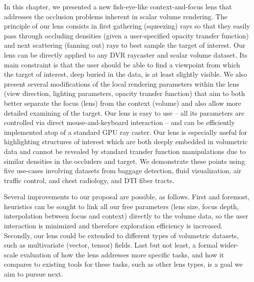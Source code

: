 In this chapter, we presented a new fish-eye-like context-and-focus lens that addresses the occlusion problems inherent in scalar volume rendering. The principle of our lens consists in first gathering (squeezing) rays so that they easily pass through occluding densities (given a user-specified opacity transfer function) and next scattering (fanning out) rays to best sample the target of interest. Our lens can be directly applied to any DVR raycaster and scalar volume dataset. Its main constraint is that the user should be able to find a viewpoint from which the target of interest, deep buried in the data, is at least slightly visible. We also present several modifications of the local rendering parameters within the lens (view direction, lighting parameters, opacity transfer function) that aim to both better separate the focus (lens) from the context (volume) and also allow more detailed examining of the target. Our lens is easy to use -- all its parameters are controlled via direct mouse-and-keyboard interaction -- and can be efficiently implemented atop of a standard GPU ray caster. Our lens is especially useful for highlighting structures of interest which are both deeply embedded in volumetric data and cannot be revealed by standard transfer function manipulations due to similar densities in the occluders and target. We demonstrate these points using five use-cases involving datasets from baggage detection, fluid visualization, air traffic control, and chest radiology, and DTI fiber tracts.

Several improvements to our proposal are possible, as follows. First and foremost, heuristics can be sought to link all our free parameters (lens size, focus depth, interpolation between focus and context) directly to the volume data, so the user interaction is minimized and therefore exploration efficiency is increased. Secondly, our lens could be extended to different types of volumetric datasets, such as multivariate (vector, tensor) fields. Last but not least, a formal wider-scale evaluation of how the lens addresses more specific tasks, and how it compares to existing tools for these tasks, such as other lens types, is a goal we aim to pursue next.